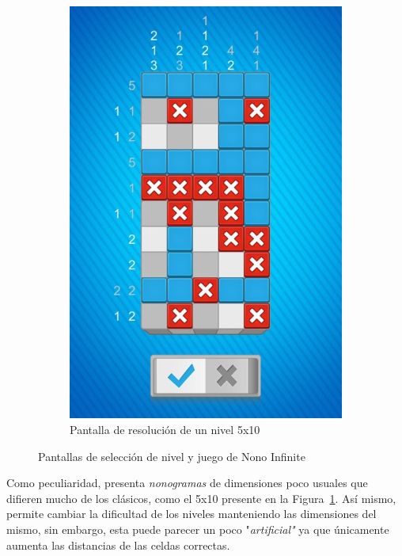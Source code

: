 \begin{figure}[h!]
\begin{subfigure}[b]{0.49\linewidth}
     \includegraphics[width=\linewidth]{images/infinite2.png}
     \caption{Pantalla de resolución de un nivel 5x10}
     \label{fig:infinite1-2}
   \end{subfigure}
   \caption{Pantallas de selección de nivel y juego de Nono Infinite}
   \label{fig:infinite1}
 \end{figure}

Como peculiaridad, presenta \textit{nonogramas} de dimensiones poco usuales que difieren mucho de los clásicos, como el 5x10 presente en la
Figura~\ref{fig:infinite1-2}. Así mismo, permite cambiar la dificultad de los niveles manteniendo las dimensiones del mismo, sin embargo,
esta puede parecer un poco "\textit{artificial"} ya que únicamente aumenta las distancias de las celdas correctas.

